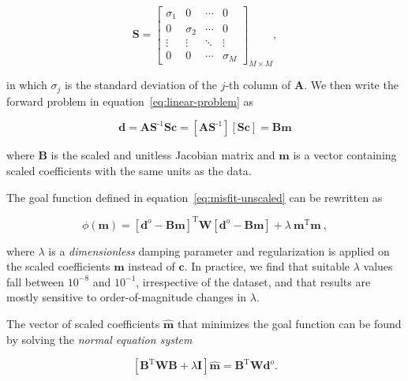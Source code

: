\documentclass[twocolumn]{article}
\newcommand{\inv}{^{\text{-}1}}
\newcommand{\trans}{^{\text{T}}}
\begin{document}
\begin{equation}
    \mathbf{S} =
    \begin{bmatrix}
      \sigma_1 & 0 & \cdots &0 \\
      0 & \sigma_2 & \cdots &0 \\
      \vdots & \vdots & \ddots & \vdots \\
      0  & 0 & \cdots & \sigma_M
    \end{bmatrix}_{M \times M}
    ,
\end{equation}

\noindent in which $\sigma_j$ is the standard deviation of the $j$-th column of
$\mathbf{A}$.
We then write the forward problem in equation~\ref{eq:linear-problem} as

\begin{equation}
    \mathbf{d}
    =
    \mathbf{A} \mathbf{S}\inv \mathbf{S} \mathbf{c}
    =
    \left[
        \mathbf{A} \mathbf{S}\inv
    \right]
    \left[
        \mathbf{S} \mathbf{c}
    \right]
    =
    \mathbf{B} \mathbf{m}
\end{equation}

\noindent where $\mathbf{B}$ is the scaled and unitless Jacobian matrix and
$\mathbf{m}$ is a vector containing scaled coefficients with the same units as
the data.

The goal function defined in equation~\ref{eq:misfit-unscaled} can be
rewritten as

\begin{equation}
    \phi(\mathbf{m}) =
    \left[\mathbf{d}^o - \mathbf{B}\mathbf{m}\right]\trans
    \mathbf{W}
    \left[\mathbf{d}^o - \mathbf{B}\mathbf{m}\right]
    + \lambda\ \mathbf{m}\trans\mathbf{m}
    \ ,
    \label{eq:misfit}
\end{equation}

\noindent where $\lambda$ is a \emph{dimensionless} damping parameter and
regularization is applied on the scaled coefficients $\mathbf{m}$ instead of
$\mathbf{c}$.
In practice, we find that suitable $\lambda$ values fall between $10^{-8}$ and
$10^{-1}$, irrespective of the dataset, and that results are mostly sensitive
to order-of-magnitude changes in $\lambda$.

The vector of scaled coefficients $\hat{\mathbf{m}}$ that minimizes the goal
function can be found by solving the \emph{normal equation system}
\citep{menke1989}

\begin{equation}
    \left[
      \mathbf{B}\trans \mathbf{W} \mathbf{B} + \lambda \mathbf{I}
    \right]
    \hat{\mathbf{m}} =
    \mathbf{B}\trans\mathbf{W}
    \mathbf{d}^o.
\end{equation}
\end{document}
